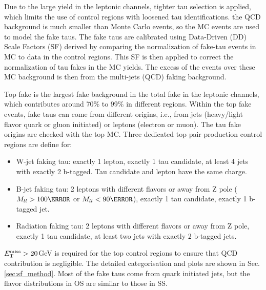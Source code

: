 Due to the large yield in the leptonic channels, tighter tau selection is applied, which limits the use of control regions with loosened tau identifications. the QCD background is much smaller than Monte Carlo events, so the MC events are used to model the fake taus. The fake taus are calibrated using Data-Driven (DD) Scale Factors (SF) derived by comparing the normalization of fake-tau events in MC to data in the control regions.
This SF is then applied to correct the normalization of tau fakes in the MC yields. The excess of the events over these MC background is then from the multi-jets (QCD) faking background.

Top fake is the largest fake background in the total fake in the leptonic channels, which contributes around 70\% to 99\% in different regions.
Within the top fake events, fake taus can come from different origins, i.e., from jets (heavy/light flavor quark or gluon initiated) 
or leptons (electron or muon). The tau fake 
origins are checked with the top MC. Three dedicated top pair production control regions are define for:
\begin{itemize}
\item{W-jet faking tau: exactly 1 lepton, exactly 1 tau candidate, at least 4 jets with exactly 2 b-tagged. Tau candidate and lepton have the same charge.}
\item{B-jet faking tau: 2 leptons with different flavors or away from Z pole ($M_{ll}>100\GeV$ or $M_{ll}<90\GeV$), exactly 1 tau candidate, exactly 1 b-tagged jet.}
\item{Radiation faking tau: 2 leptons with different flavors or away from Z pole, exactly 1 tau candidate, at least two jets with exactly 2 b-tagged jets.}
\end{itemize}
$E_{\text{T}}^{\text{miss}} > 20$GeV is required for the top control regions to ensure that QCD contribution is negligible. The detailed categorisation and plots are shown in Sec. \ref{sec:sf_method}.
Most of the fake taus come from quark initiated jets, but the flavor distributions in OS are similar to those in SS. 


